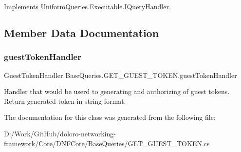 Implements \mbox{\hyperlink{interface_uniform_queries_1_1_executable_1_1_i_query_handler_a0f43184bf3e306a7cbebc39098f044ee}{Uniform\+Queries.\+Executable.\+I\+Query\+Handler}}.



\subsection{Member Data Documentation}
\mbox{\label{class_base_queries_1_1_g_e_t___g_u_e_s_t___t_o_k_e_n_abf7dded72bc2a686ab8e179a413efaae}} 
\subsubsection{\texorpdfstring{guest\+Token\+Handler}{guestTokenHandler}}
{\footnotesize\ttfamily Guest\+Token\+Handler Base\+Queries.\+G\+E\+T\+\_\+\+G\+U\+E\+S\+T\+\_\+\+T\+O\+K\+E\+N.\+guest\+Token\+Handler\hspace{0.3cm}{\ttfamily [static]}}



Handler that would be userd to generating and authorizing of guest tokens. Return generated token in string format. 



The documentation for this class was generated from the following file\+:\begin{DoxyCompactItemize}
\item 
D\+:/\+Work/\+Git\+Hub/doloro-\/networking-\/framework/\+Core/\+D\+N\+F\+Core/\+Base\+Queries/G\+E\+T\+\_\+\+G\+U\+E\+S\+T\+\_\+\+T\+O\+K\+E\+N.\+cs\end{DoxyCompactItemize}
